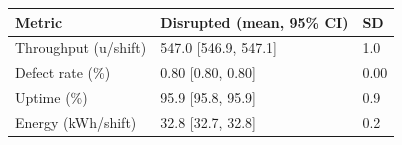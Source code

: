 \begin{tabular}{p{2.6cm}p{2.2cm}p{1.4cm}}
\toprule
\textbf{Metric} & \textbf{Disrupted (mean, 95\% CI)} & \textbf{SD} \\
\midrule
Throughput (u/shift) & 547.0 [546.9, 547.1] & 1.0 \\
Defect rate (\%) & 0.80 [0.80, 0.80] & 0.00 \\
Uptime (\%) & 95.9 [95.8, 95.9] & 0.9 \\
Energy (kWh/shift) & 32.8 [32.7, 32.8] & 0.2 \\
\bottomrule
\end{tabular}
